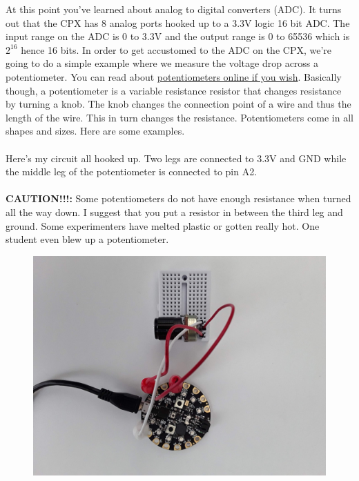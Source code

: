 At this point you've learned about analog to digital converters (ADC). It turns out that the CPX has 8 analog ports hooked up to a 3.3V logic 16 bit ADC. The input range on the ADC is 0 to 3.3V and the output range is 0 to 65536 which is $2^16$ hence 16 bits. In order to get accustomed to the ADC on the CPX, we’re going to do a simple example where we measure the voltage drop across a potentiometer. You can read about \href{https://www.build-electronic-circuits.com/potentiometer/}{potentiometers online if you wish}. Basically though, a potentiometer is a variable resistance resistor that changes resistance by turning a knob. The knob changes the connection point of a wire and thus the length of the wire. This in turn changes the resistance. Potentiometers come in all shapes and sizes. Here are some examples.
\ \\
\ \\
Here’s my circuit all hooked up. Two legs are connected to 3.3V and GND while the middle leg of the potentiometer is connected to pin A2.
\ \\
\ \\
{\bf CAUTION!!!:} Some potentiometers do not have enough resistance when turned all the way down. I suggest that you put a resistor in between the third leg and ground. Some experimenters have melted plastic or gotten really hot. One student even blew up a potentiometer.
\begin{figure}[H]
  \begin{center}
    \includegraphics[width=\textwidth]{Figures/potentiometer1.jpeg}
  \end{center}
\end{figure}

